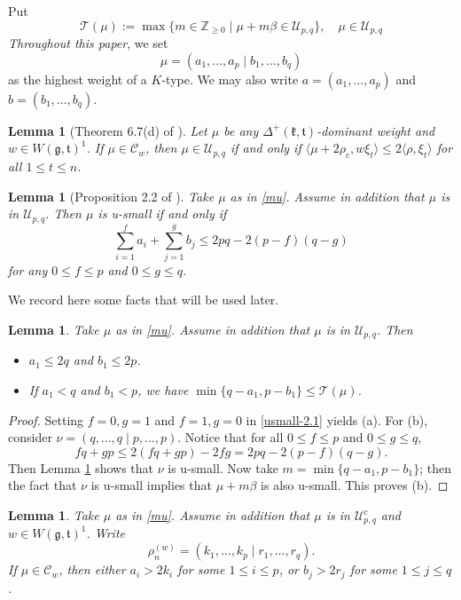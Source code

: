 \documentclass[11pt]{amsart}
\theoremstyle{plain}
\newtheorem{lemma}[thm]{Lemma}
\theoremstyle{definition}
\newcommand{\frg}{\mathfrak{g}}
\newcommand{\frk}{\mathfrak{k}}
\newcommand{\frt}{\mathfrak{t}}
\newcommand{\bbZ}{\mathbb{Z}}
\newcommand{\caC}{\mathcal{C}}
\newcommand{\caU}{\mathcal{U}}
\begin{document}
  Put
 \begin{equation}\label{T}
 	\mathcal{T}(\mu):=\max\{m\in\bbZ_{\ge 0}\mid \mu+m\beta\in\mathcal{U}_{p,q}\},\quad \mu\in \mathcal{U}_{p,q}
 \end{equation}
 \emph{Throughout this paper}, we set
 \begin{equation}\label{mu}
 	\mu=(a_1, \dots, a_p \mid b_1, \dots, b_q)
 \end{equation}
 as the highest weight of a $K$-type. We may also write $a=(a_1, \dots, a_p)$ and $b=(b_1, \dots, b_q)$.

\begin{lemma}[Theorem 6.7(d) of \cite{SV}]\label{usmall-1}
	Let $\mu$ be any $\Delta^+(\frk, \frt)$-dominant weight and $w\in W(\frg, \frt)^1$. If $\mu\in \mathcal{C}_w$, then $\mu \in\mathcal{U}_{p, q}$ if and only if $\langle\mu+2\rho_c, w\xi_t \rangle\le 2\langle \rho, \xi_t \rangle$ for all $1\le t\le n$.
\end{lemma}
\begin{lemma}[Proposition 2.2 of \cite{DY}]\label{usmall-2}
Take $\mu$ as in \eqref{mu}. Assume in addition that $\mu$ is in $\caU_{p,q}$. Then $\mu$ is u-small if and only if
	\begin{equation}\label{usmall-2.1}
		\sum_{i=1}^f a_i+\sum_{j=1}^g b_j\le 2pq-2(p-f)(q-g)
	\end{equation}
	for any $0\le f\le p$ and $0\le g\le q$.
\end{lemma}
We record here some facts that will be used later.
\begin{lemma}\label{m}
Take $\mu$ as in \eqref{mu}. Assume in addition that $\mu$ is in $\caU_{p,q}$. Then
	\begin{itemize}
		\item[(a)] $a_1\le 2q$ and $b_1\le 2p$.
		\item[(b)] If $a_1< q$ and $b_1< p$, we have $\min\{q-a_1,p-b_1\}\le \mathcal{T}(\mu)$.
	\end{itemize}
\end{lemma}
\begin{proof}
	Setting $f=0, g=1$ and $f=1, g=0$ in \eqref{usmall-2.1} yields (a). For (b), consider $\nu=(q,\dots,q\mid p,\dots,p)$. Notice that for all $0\le f\le p$ and $0\le g\le q$,
	\[fq+gp\le 2(fq+gp)-2fg=2pq-2(p-f)(q-g).\]
	Then Lemma \ref{usmall-2} shows that $\nu$ is u-small. Now take $m=\min\{q-a_1, p-b_1\}$; then the fact that $\nu$ is u-small implies that $\mu+m\beta$ is also u-small. This proves (b).
\end{proof}
\begin{lemma}\label{large}
	Take $\mu$ as in \eqref{mu}. Assume in addition that $\mu$ is in $\caU_{p,q}^c$ and $w\in W(\frg,\frt)^1$. Write
	\[\rho_n^{(w)}=(k_1, \dots, k_p \mid r_1, \dots, r_q).\]
	 If $\mu \in \caC_w$, then either $a_i>2k_i$ for some $1\le i\le p$, or $b_j>2r_j$ for some $1\le j\le q$.
\end{lemma}
\end{document}
